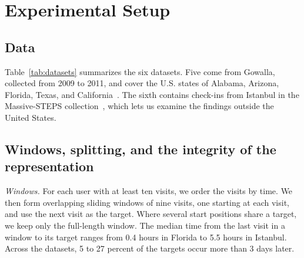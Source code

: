 \section{Experimental Setup}
\label{sec:setup}

\subsection{Data}
\label{sec:setup-data}
Table~\ref{tab:datasets} summarizes the six datasets. Five come from Gowalla, collected from 2009 to 2011, and cover the U.S. states of Alabama, Arizona, Florida, Texas, and California~\cite{cho2011gowalla}. The sixth contains check-ins from Istanbul in the Massive-STEPS collection~\cite{wongso2025massivesteps}, which lets us examine the findings outside the United States.


\subsection{Windows, splitting, and the integrity of the representation}
\label{sec:setup-windows}
\emph{Windows.} For each user with at least ten visits, we order the visits by time. We then form overlapping sliding windows of nine visits, one starting at each visit, and use the next visit as the target. Where several start positions share a target, we keep only the full-length window. The median time from the last visit in a window to its target ranges from 0.4 hours in Florida to 5.5 hours in Istanbul. Across the datasets, 5 to 27 percent of the targets occur more than 3 days later.

